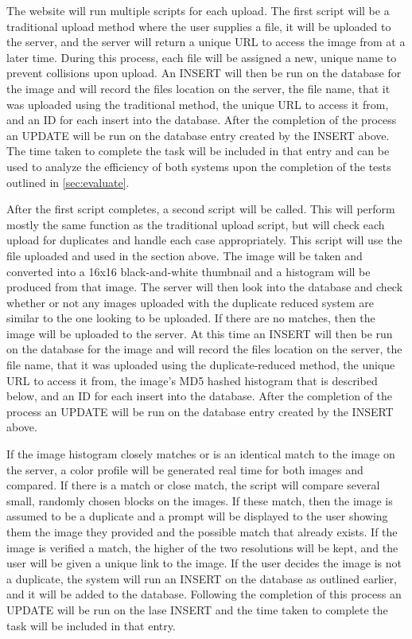 \documentclass[11pt]{article}
\begin{document}
The website will run multiple scripts for each upload. The first script will be a traditional upload method where the user supplies a file, it will be uploaded to the server, and the server will return a unique URL to access the image from at a later time. During this process, each file will be assigned a new, unique name to prevent collisions upon upload. An INSERT will then be run on the database for the image and will record the files location on the server, the file name, that it was uploaded using the traditional method, the unique URL to access it from, and an ID for each insert into the database. After the completion of the process an UPDATE will be run on the database entry created by the INSERT above. The time taken to complete the task will be included in that entry and can be used to analyze the efficiency of both systems upon the completion of the tests outlined in \ref{sec:evaluate}.

After the first script completes, a second script will be called. This will perform mostly the same function as the traditional upload script, but will check each upload for duplicates and handle each case appropriately. This script will use the file uploaded and used in the section above. The image will be taken and converted into a 16x16 black-and-white thumbnail and a histogram will be produced from that image. The server will then look into the database and check whether or not any images uploaded with the duplicate reduced system are similar to the one looking to be uploaded. If there are no matches, then the image will be uploaded to the server. At this time an INSERT will then be run on the database for the image and will record the files location on the server, the file name, that it was uploaded using the duplicate-reduced method, the unique URL to access it from, the image's MD5 hashed histogram that is described below, and an ID for each insert into the database. After the completion of the process an UPDATE will be run on the database entry created by the INSERT above.

If the image histogram closely matches or is an identical match to the image on the server, a color profile will be generated real time for both images and compared. If there is a match or close match, the script will compare several small, randomly chosen blocks on the images. If these match, then the image is assumed to be a  duplicate and a prompt will be displayed to the user showing them the image they provided and the possible match that already exists. If the image is verified a match, the higher of the two resolutions will be kept, and the user will be given a unique link to the image. If the user decides the image is not a duplicate, the system will run an INSERT on the database as outlined earlier, and it will be added to the database. Following the completion of this process an UPDATE will be run on the lase INSERT and the time taken to complete the task will be included in that entry.
\end{document}
